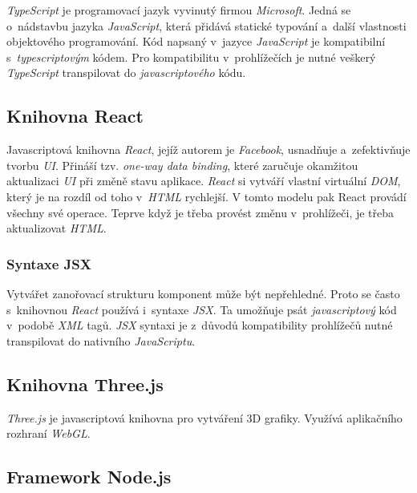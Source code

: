\documentclass[a4paper,12pt]{article}
\begin{document}
\textit{TypeScript} je programovací jazyk vyvinutý firmou \textit{Microsoft}. Jedná se o~nádstavbu jazyka \textit{JavaScript}, která přidává statické typování a~další vlastnosti objektového programování. Kód napsaný v~jazyce \textit{JavaScript} je kompatibilní s~\textit{typescriptovým} kódem. Pro kompatibilitu v~prohlížečích je nutné veškerý \textit{TypeScript} transpilovat do \textit{javascriptového} kódu.

\subsection{Knihovna React}

Javascriptová knihovna \textit{React}, jejíž autorem je \textit{Facebook}, usnadňuje a~zefektivňuje tvorbu \textit{UI}. Přináší tzv. \textit{one-way data binding}, které zaručuje okamžitou aktualizaci \textit{UI} při změně stavu aplikace. \textit{React} si vytváří vlastní virtuální \textit{DOM}, který je na rozdíl od toho v~\textit{HTML} rychlejší. V tomto modelu pak React provádí všechny své operace. Teprve když je třeba provést změnu v~prohlížeči, je třeba  aktualizovat \textit{HTML}.

\subsubsection{Syntaxe JSX}

Vytvářet zanořovací strukturu komponent může být nepřehledné. Proto se často s~knihovnou \textit{React} používá i~syntaxe \textit{JSX}. Ta umožňuje psát \textit{javascriptový} kód v~podobě \textit{XML} tagů. \textit{JSX} syntaxi je z~důvodů kompatibility prohlížečů nutné transpilovat do nativního \textit{JavaScriptu}.



\subsection{Knihovna Three.js}

\textit{Three.js} je javascriptová knihovna pro vytváření 3D grafiky. Využívá aplikačního rozhraní \textit{WebGL}.

\subsection{Framework Node.js}
\end{document}
